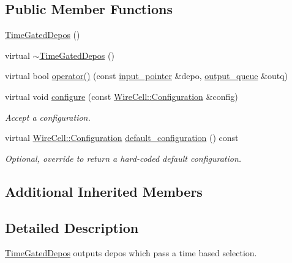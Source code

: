 \subsection*{Public Member Functions}
\begin{DoxyCompactItemize}
\item 
\hyperlink{class_wire_cell_1_1_gen_1_1_time_gated_depos_ae2474173c20658bf9cd2a00005e6e006}{Time\+Gated\+Depos} ()
\item 
virtual \hyperlink{class_wire_cell_1_1_gen_1_1_time_gated_depos_a6a38f6c111683a7ee885db4213413c95}{$\sim$\+Time\+Gated\+Depos} ()
\item 
virtual bool \hyperlink{class_wire_cell_1_1_gen_1_1_time_gated_depos_ad457a966103e9cd5e0c9b1dba36374d1}{operator()} (const \hyperlink{class_wire_cell_1_1_i_queuedout_node_acf5f716a764553f3c7055a9cf67e906e}{input\+\_\+pointer} \&depo, \hyperlink{class_wire_cell_1_1_i_queuedout_node_a39018e4e3dd886befac9636ac791a685}{output\+\_\+queue} \&outq)
\item 
virtual void \hyperlink{class_wire_cell_1_1_gen_1_1_time_gated_depos_a7bc3213029b51a4017ba216d0c674dc3}{configure} (const \hyperlink{namespace_wire_cell_a9f705541fc1d46c608b3d32c182333ee}{Wire\+Cell\+::\+Configuration} \&config)
\begin{DoxyCompactList}\small\item\em Accept a configuration. \end{DoxyCompactList}\item 
virtual \hyperlink{namespace_wire_cell_a9f705541fc1d46c608b3d32c182333ee}{Wire\+Cell\+::\+Configuration} \hyperlink{class_wire_cell_1_1_gen_1_1_time_gated_depos_a7a9b90856b2e7c8c0bed942eb6c21d03}{default\+\_\+configuration} () const
\begin{DoxyCompactList}\small\item\em Optional, override to return a hard-\/coded default configuration. \end{DoxyCompactList}\end{DoxyCompactItemize}
\subsection*{Additional Inherited Members}


\subsection{Detailed Description}
\hyperlink{class_wire_cell_1_1_gen_1_1_time_gated_depos}{Time\+Gated\+Depos} outputs depos which pass a time based selection.

